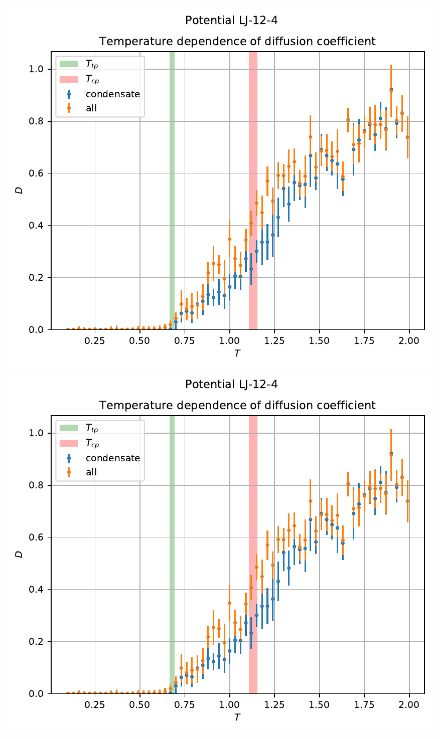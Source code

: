 \documentclass[pdf,hyperref={unicode}]{beamer}
\begin{document}
\begin{frame}
\transdissolve[duration=0.2]

\begin{figure}[h]
\begin{center}
\begin{minipage}[h]{0.35\linewidth}
\includegraphics[width=\textwidth, keepaspectratio]{plot_diffusion_Potential LJ-12-4_1}
\end{minipage}
\begin{minipage}[h]{0.35\linewidth}
\includegraphics[width=\textwidth, keepaspectratio]{plot_diffusion_Potential LJ-12-4_1}

\end{minipage}
\end{center}
\end{figure}
\end{frame}
\end{document}
